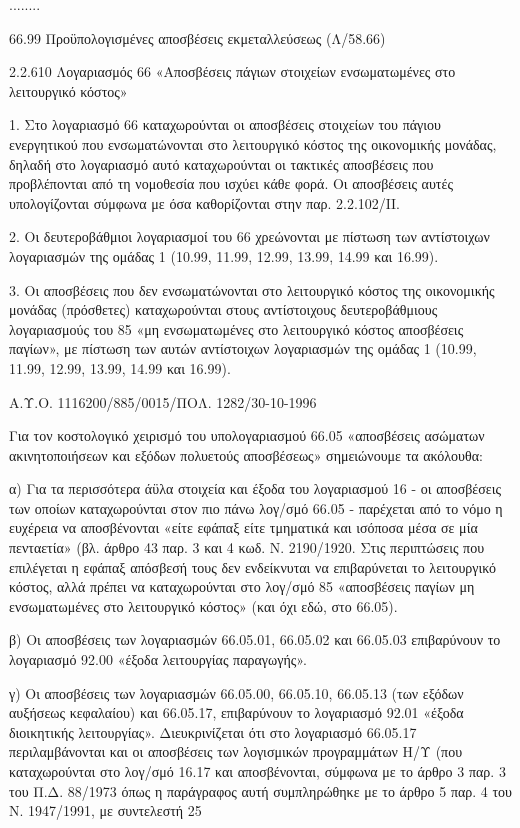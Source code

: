 \documentclass[A4,10pt,greek]{book}
\begin{document}
        ........

        66.99 Προϋπολογισμένες αποσβέσεις εκμεταλλεύσεως (Λ/58.66)

 

2.2.610 Λογαριασμός 66 «Αποσβέσεις πάγιων στοιχείων ενσωματωμένες στο λειτουργικό κόστος»

1. Στο λογαριασμό 66 καταχωρούνται οι αποσβέσεις στοιχείων του πάγιου ενεργητικού που ενσωματώνονται στο λειτουργικό κόστος της οικονομικής μονάδας, δηλαδή στο λογαριασμό αυτό καταχωρούνται οι τακτικές αποσβέσεις που προβλέπονται από τη νομοθεσία που ισχύει κάθε φορά. Οι αποσβέσεις αυτές υπολογίζονται σύμφωνα με όσα καθορίζονται στην παρ. 2.2.102/ΙΙ.

2. Οι δευτεροβάθμιοι λογαριασμοί του 66 χρεώνονται με πίστωση των αντίστοιχων λογαριασμών της ομάδας 1 (10.99, 11.99, 12.99, 13.99, 14.99 και 16.99).

3. Οι αποσβέσεις που δεν ενσωματώνονται στο λειτουργικό κόστος της οικονομικής μονάδας (πρόσθετες) καταχωρούνται στους αντίστοιχους δευτεροβάθμιους λογαριασμούς του 85 «μη ενσωματωμένες στο λειτουργικό κόστος αποσβέσεις παγίων», με πίστωση των αυτών αντίστοιχων λογαριασμών της ομάδας 1 (10.99, 11.99, 12.99, 13.99, 14.99 και 16.99).

Α.Υ.Ο. 1116200/885/0015/ΠΟΛ. 1282/30-10-1996

Για τον κοστολογικό χειρισμό του υπολογαριασμού 66.05 «αποσβέσεις ασώματων ακινητοποιήσεων και εξόδων πολυετούς αποσβέσεως» σημειώνουμε τα ακόλουθα:

α) Για τα περισσότερα άϋλα στοιχεία και έξοδα του λογαριασμού 16 - οι αποσβέσεις των οποίων καταχωρούνται στον πιο πάνω λογ/σμό 66.05 - παρέχεται από το νόμο η ευχέρεια να αποσβένονται «είτε εφάπαξ είτε τμηματικά και ισόποσα μέσα σε μία πενταετία» (βλ. άρθρο 43 παρ. 3 και 4 κωδ. Ν. 2190/1920. Στις περιπτώσεις που επιλέγεται η εφάπαξ απόσβεσή τους δεν ενδείκνυται να επιβαρύνεται το λειτουργικό κόστος, αλλά πρέπει να καταχωρούνται στο λογ/σμό 85 «αποσβέσεις παγίων μη ενσωματωμένες στο λειτουργικό κόστος» (και όχι εδώ, στο 66.05).

β) Οι αποσβέσεις των λογαριασμών 66.05.01, 66.05.02 και 66.05.03 επιβαρύνουν το λογαριασμό 92.00 «έξοδα λειτουργίας παραγωγής».

γ) Οι αποσβέσεις των λογαριασμών 66.05.00, 66.05.10, 66.05.13 (των εξόδων αυξήσεως κεφαλαίου) και 66.05.17, επιβαρύνουν το λογαριασμό 92.01 «έξοδα διοικητικής λειτουργίας». Διευκρινίζεται ότι στο λογαριασμό 66.05.17 περιλαμβάνονται και οι αποσβέσεις των λογισμικών προγραμμάτων Η/Υ (που καταχωρούνται στο λογ/σμό 16.17 και αποσβένονται, σύμφωνα με το άρθρο 3 παρ. 3 του Π.Δ. 88/1973 όπως η παράγραφος αυτή συμπληρώθηκε με το άρθρο 5 παρ. 4 του Ν. 1947/1991, με συντελεστή 25%
\end{document}
